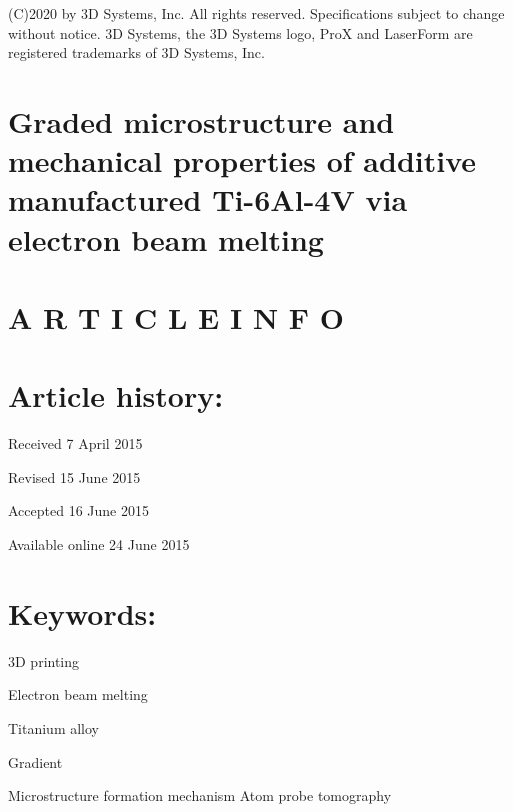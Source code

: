 \documentclass[10pt]{article}
\begin{document}
(C)2020 by 3D Systems, Inc. All rights reserved. Specifications subject to change without notice. 3D Systems, the 3D Systems logo, ProX and LaserForm are registered trademarks of 3D Systems, Inc.

\section*{Graded microstructure and mechanical properties of additive manufactured Ti-6Al-4V via electron beam melting }


\section*{A R T I C L E I N F O}
\section*{Article history:}
Received 7 April 2015

Revised 15 June 2015

Accepted 16 June 2015

Available online 24 June 2015

\section*{Keywords:}
3D printing

Electron beam melting

Titanium alloy

Gradient

Microstructure formation mechanism Atom probe tomography
\end{document}
